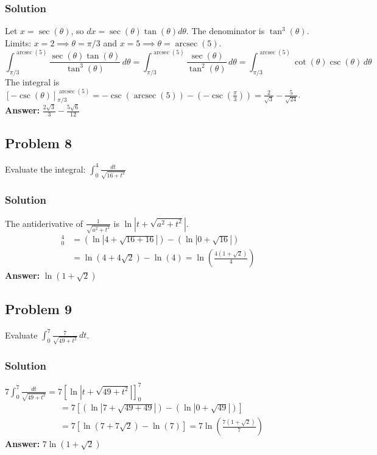 \documentclass{article}
\begin{document}
\subsubsection*{Solution}
Let $ x = \sec(\theta) $, so $ dx = \sec(\theta)\tan(\theta)d\theta $. The denominator is $ \tan^3(\theta) $.
Limits: $ x=2 \implies \theta = \pi/3 $ and $ x=5 \implies \theta = \operatorname{arcsec}(5) $.
\[ \int_{\pi/3}^{\operatorname{arcsec}(5)} \frac{\sec(\theta)\tan(\theta)}{\tan^3(\theta)} \,d\theta = \int_{\pi/3}^{\operatorname{arcsec}(5)} \frac{\sec(\theta)}{\tan^2(\theta)} \,d\theta = \int_{\pi/3}^{\operatorname{arcsec}(5)} \cot(\theta)\csc(\theta) \,d\theta \]
The integral is $ [-\csc(\theta)]_{\pi/3}^{\operatorname{arcsec}(5)} = -\csc(\operatorname{arcsec}(5)) - (-\csc(\frac{\pi}{3})) = \frac{2}{\sqrt{3}} - \frac{5}{\sqrt{24}} $.
\textbf{Answer:} $ \frac{2\sqrt{3}}{3} - \frac{5\sqrt{6}}{12} $
 

\subsection{Problem 8}
Evaluate the integral: $ \int_{0}^{4} \frac{dt}{\sqrt{16 + t^2}} $
\subsubsection*{Solution}
The antiderivative of $ \frac{1}{\sqrt{a^2 + t^2}} $ is $ \ln|t + \sqrt{a^2 + t^2}| $.
\begin{align*}
[\ln|t + \sqrt{16 + t^2}|]_{0}^{4} &= (\ln|4 + \sqrt{16 + 16}|) - (\ln|0 + \sqrt{16}|) \\
&= \ln(4 + 4\sqrt{2}) - \ln(4) = \ln\left(\frac{4(1 + \sqrt{2})}{4}\right)
\end{align*}
\textbf{Answer:} $ \ln(1 + \sqrt{2}) $
 

\subsection{Problem 9}
Evaluate $ \int_{0}^{7} \frac{7}{\sqrt{49 + t^2}} \,dt $.
\subsubsection*{Solution}
$ 7 \int_{0}^{7} \frac{dt}{\sqrt{49 + t^2}} = 7 [\ln|t + \sqrt{49 + t^2}|]_{0}^{7} $
\begin{align*}
&= 7 [(\ln|7 + \sqrt{49+49}|) - (\ln|0 + \sqrt{49}|)] \\
&= 7 [\ln(7 + 7\sqrt{2}) - \ln(7)] = 7 \ln\left(\frac{7(1+\sqrt{2})}{7}\right)
\end{align*}
\textbf{Answer:} $ 7 \ln(1 + \sqrt{2}) $
 
\end{document}
